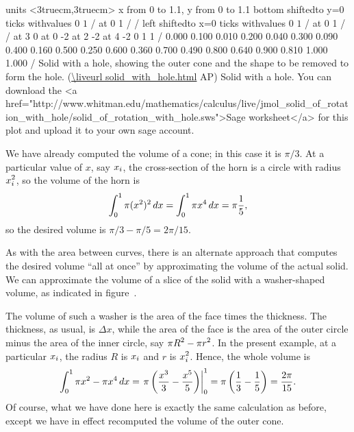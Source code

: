 \figure
\texonly
\vbox{\beginpicture
\normalgraphs
\ninepoint
\setcoordinatesystem units <3truecm,3truecm>
\setplotarea x from 0 to 1.1, y from 0 to 1.1
\axis bottom shiftedto y=0 ticks withvalues {$0$} {$1$} / at 0 1 / /
\axis left shiftedto x=0 ticks withvalues {$0$} {$1$} / at 0 1 / /
 at 3 0
 at 0 -2
 at 2 -2
 at 4 -2
 0 1 1 /
\setquadratic
{} 0.000 0.100 0.010 0.200 0.040 0.300 0.090 0.400 0.160 
0.500 0.250 0.600 0.360 0.700 0.490 0.800 0.640 0.900 0.810 
1.000 1.000 /
\endpicture}
\begincaption
Solid with a hole, showing the outer cone and the shape to
be removed to form the hole.
(\expandafter\url\expandafter{\liveurl solid_with_hole.html}%
AP\endurl)
\endcaption
\endtexonly
{}
\htmlonly
\begincaption
Solid with a hole. You can download the <a href="http://www.whitman.edu/mathematics/calculus/live/jmol_solid_of_rotation_with_hole/solid_of_rotation_with_hole.sws">Sage
worksheet</a>
for this plot and upload it to your own sage account.
\endcaption
\endhtmlonly
\endfigure

We have already computed the volume of a cone; in this case it is
$\pi/3$. At a particular value of $x$, say $\displaystyle x_i$, the cross-section of
the horn is a circle with radius $\displaystyle x_i^2$, so the volume of the horn is
$$\int_0^1 \pi(x^2)^2\,dx=\int_0^1 \pi x^4\,dx=\pi{1\over 5},$$
so the desired volume is $\pi/3-\pi/5=2\pi/15$.

As with the area between curves, there is an alternate approach that
computes the desired volume ``all at once'' by approximating the
volume of the actual solid. We can approximate the volume of a slice
of the solid with a washer-shaped volume, as indicated in
figure~.

The volume of such a washer is the area of the face times the
thickness. The thickness, as usual, is $\Delta x$, while the area of
the face is the area of the outer circle minus the area of the inner
circle, say $\displaystyle \pi R^2-\pi r^2$. In the present example, at a particular $\displaystyle x_i$,
the radius $R$ is $\displaystyle x_i$ and $r$ is $\displaystyle x_i^2$. Hence, the whole volume is
$$
  \int_0^1 \pi x^2-\pi x^4\,dx=
  \left.\pi\left({x^3\over3}-{x^5\over5}\right)\right|_0^1=
  \pi\left({1\over3}-{1\over5}\right)={2\pi\over15}.
$$
Of course, what we have done here is exactly the same calculation as
before, except we have in effect recomputed the volume of the outer cone.
\endexample

